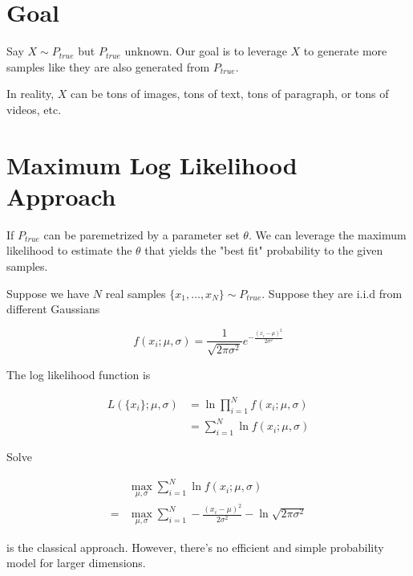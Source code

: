 \documentclass{article}
\begin{document}
    \section*{Goal}

        Say $ X \sim P_{true} $ but $ P_{true} $ unknown. Our goal is to
        leverage $ X $ to generate more samples like they are also generated
        from $ P_{true} $.

        In reality, $ X $ can be tons of images, tons of text, tons of paragraph,
        or tons of videos, etc.

    \section*{Maximum Log Likelihood Approach}

        If $ P_{true} $ can be paremetrized by a parameter set $ \theta $.
        We can leverage the maximum likelihood to estimate the $ \theta $ that
        yields the "best fit" probability to the given samples.

        Suppose we have $ N $ real samples $ \{ x_{1}, \dots, x_{N} \} \sim P_{true} $.
        Suppose they are i.i.d from different Gaussians

        \begin{equation*}
            f( x_{i}; \mu, \sigma ) = \frac{1}{\sqrt{2 \pi \sigma^2}} e^{-\frac{(x_{i} - \mu)^2}{2 \sigma^2}}
        \end{equation*}

        The log likelihood function is

        \begin{align*}
             L( \{ x_{i} \}; \mu, \sigma ) &= \ln \prod_{i=1}^N f( x_{i}; \mu, \sigma ) \\
                             &= \sum_{i = 1}^N \ln f( x_{i}; \mu, \sigma )
        \end{align*}

        Solve

        \begin{align*}
              & \max_{\mu, \sigma} \sum_{i = 1}^N \ln f( x_{i}; \mu, \sigma ) \\
            = & \max_{\mu, \sigma} \sum_{i = 1}^N -\frac{( x_{i} - \mu ) ^ 2}{2
            \sigma^2} - \ln \sqrt{2 \pi \sigma^2 }
        \end{align*}

        is the classical approach. However, there's no efficient
        and simple probability model for larger dimensions.
\end{document}
